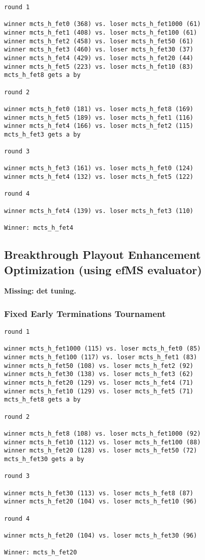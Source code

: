 \documentclass{article}
\begin{document}
\begin{verbatim}
round 1

winner mcts_h_fet0 (368) vs. loser mcts_h_fet1000 (61)
winner mcts_h_fet1 (408) vs. loser mcts_h_fet100 (61)
winner mcts_h_fet2 (458) vs. loser mcts_h_fet50 (61)
winner mcts_h_fet3 (460) vs. loser mcts_h_fet30 (37)
winner mcts_h_fet4 (429) vs. loser mcts_h_fet20 (44)
winner mcts_h_fet5 (223) vs. loser mcts_h_fet10 (83)
mcts_h_fet8 gets a by

round 2

winner mcts_h_fet0 (181) vs. loser mcts_h_fet8 (169)
winner mcts_h_fet5 (189) vs. loser mcts_h_fet1 (116)
winner mcts_h_fet4 (166) vs. loser mcts_h_fet2 (115)
mcts_h_fet3 gets a by

round 3

winner mcts_h_fet3 (161) vs. loser mcts_h_fet0 (124)
winner mcts_h_fet4 (132) vs. loser mcts_h_fet5 (122)

round 4

winner mcts_h_fet4 (139) vs. loser mcts_h_fet3 (110)

Winner: mcts_h_fet4
\end{verbatim}


\subsection{Breakthrough Playout Enhancement Optimization (using efMS evaluator)}

{\bf {\color{red} Missing: det tuning.}}

\subsubsection{Fixed Early Terminations Tournament}

\begin{verbatim}
round 1

winner mcts_h_fet1000 (115) vs. loser mcts_h_fet0 (85)
winner mcts_h_fet100 (117) vs. loser mcts_h_fet1 (83)
winner mcts_h_fet50 (108) vs. loser mcts_h_fet2 (92)
winner mcts_h_fet30 (138) vs. loser mcts_h_fet3 (62)
winner mcts_h_fet20 (129) vs. loser mcts_h_fet4 (71)
winner mcts_h_fet10 (129) vs. loser mcts_h_fet5 (71)
mcts_h_fet8 gets a by

round 2

winner mcts_h_fet8 (108) vs. loser mcts_h_fet1000 (92)
winner mcts_h_fet10 (112) vs. loser mcts_h_fet100 (88)
winner mcts_h_fet20 (128) vs. loser mcts_h_fet50 (72)
mcts_h_fet30 gets a by

round 3

winner mcts_h_fet30 (113) vs. loser mcts_h_fet8 (87)
winner mcts_h_fet20 (104) vs. loser mcts_h_fet10 (96)

round 4

winner mcts_h_fet20 (104) vs. loser mcts_h_fet30 (96)

Winner: mcts_h_fet20
\end{verbatim}
\end{document}

